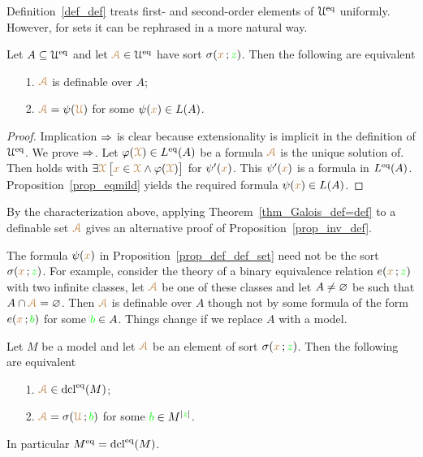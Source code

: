 \documentclass[creche.tex]{subfiles}
\begin{document}
Definition~\ref{def_def} treats first- and second-order elements of $\EuScript U^{{\rm eq}}$ uniformly.
However, for sets it can be rephrased in a more natural way.

\begin{proposition}\label{prop_def_def_set}
Let $A\subseteq\EuScript U^{{\rm eq}}$ and let ${\color{brown}\EuScript A}\in\EuScript U^{{\rm eq}}$ have sort $\sigma({\color{brown} x}\,;{\color{green} z})$.
Then the following are equivalent
\begin{itemize}
\item[1.] ${\color{brown}\EuScript A}$ is definable over $A$;
\item[2.] ${\color{brown}\EuScript A}=\psi({\color{brown}\EuScript U})$ for some $\psi({\color{brown} x})\in L(A)$.
\end{itemize}
\end{proposition}

\begin{proof}
Implication $\Rightarrow$ is clear because extensionality is implicit in the definition of $\EuScript U^{{\rm eq}}$.
We prove $\Rightarrow$.
Let $\varphi({\color{brown}\EuScript X})\in L^{{\rm eq}}(A)$ be a formula ${\color{brown}\EuScript A}$ is the unique solution of.
Then  holds with $\exists {\color{brown}\EuScript X}\,\big[{\color{brown} x}\in {\color{brown}\EuScript X}\wedge\varphi({\color{brown}\EuScript X})\big]$ for $\psi'({\color{brown} x})$. This $\psi'({\color{brown} x})$ is a formula in $L^{{\rm eq}}(A)$. Proposition~\ref{prop_eqmild} yields the required formula $\psi({\color{brown} x})\in L(A)$.
\end{proof}

By the characterization above, applying Theorem~\ref{thm_Galois_def=def} to a definable set ${\color{brown}\EuScript A}$ gives an alternative proof of Proposition~\ref{prop_inv_def}.

The formula $\psi({\color{brown} x})$ in Proposition~\ref{prop_def_def_set} need not be the sort $\sigma({\color{brown} x}\,;{\color{green} z})$.
For example, consider the theory of a binary equivalence relation $e({\color{brown} x}\,;{\color{green} z})$ with two infinite classes, let ${\color{brown}\EuScript A}$ be one of these classes and let $A\neq\varnothing$ be such that $A\cap {\color{brown}\EuScript A}=\varnothing$.
Then ${\color{brown}\EuScript A}$ is definable over $A$ though not by some formula of the form $e({\color{brown} x}\,;{\color{green} b})$ for some ${\color{green} b}\in A$.
Things change if we replace $A$ with a model.

\begin{proposition}\label{prop_standard_def_set}
Let $M$ be a model and let ${\color{brown}\EuScript A}$ be an element of sort $\sigma({\color{brown} x}\,;{\color{green} z})$.
Then the following are equivalent
\begin{itemize}
\item[1.]  ${\color{brown}\EuScript A}\in\mathop{\rm dcl}^{{\rm eq}}(M)$; 
\item[2.]  ${\color{brown}\EuScript A}=\sigma({\color{brown}\EuScript U}\,;{\color{green} b})$ for some ${\color{green} b}\in M^{|{\color{green} z}|}$.
\end{itemize}
In particular $M^{{\rm eq}}=\mathop{\rm dcl}^{{\rm eq}}(M)$.
\end{proposition}
\end{document}
